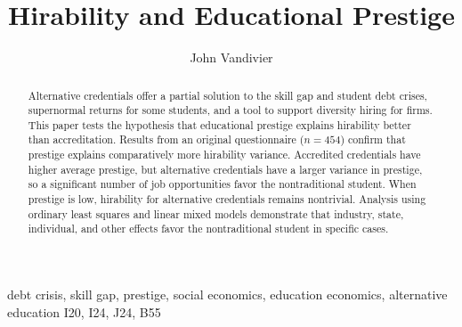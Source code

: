 \documentclass[review]{elsarticle}
\begin{document}
\begin{frontmatter}

    \title{
        Hirability and Educational Prestige
    }

    \author[mymainaddress]{John Vandivier}
    \address[mymainaddress]{4400 University Dr, Fairfax, VA 22030}

    \begin{abstract}
        Alternative credentials
        offer a partial solution to the skill gap and student debt crises,
        supernormal returns for some students,
        and a tool to support diversity hiring for firms.
        This paper tests the hypothesis that educational prestige explains hirability
        better than accreditation.
        Results from an original questionnaire ($n = 454$)
        confirm that prestige explains comparatively more hirability variance.
        Accredited credentials have higher average prestige,
        but alternative credentials have a larger variance in prestige,
        so a significant number of job opportunities favor the nontraditional student.
        When prestige is low, hirability for alternative credentials remains nontrivial.
        Analysis using ordinary least squares and linear mixed models demonstrate that
        industry, state, individual, and other effects
        favor the nontraditional student in specific cases.
    \end{abstract}

    \begin{keyword}
        debt crisis, skill gap, prestige, social economics, education economics, alternative education    %
        \MSC[2010] I20, I24, J24, B55                                                                     %
    \end{keyword}

\end{frontmatter}
\end{document}
